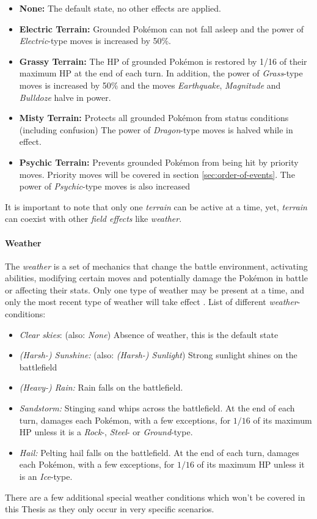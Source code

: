 \begin{itemize}
	\item \textbf{None:} The default state, no other effects are applied. 
	\item \textbf{Electric Terrain:} Grounded Pokémon can not fall asleep and the power of \textit{Electric}-type
		moves is increased by 50\%.
	\item \textbf{Grassy Terrain:} The HP of grounded Pokémon is restored by 1/16 of their maximum HP at the
		end of each turn. In addition, the power of \textit{Grass}-type moves is increased by 50\% and the 
		moves \textit{Earthquake}, \textit{Magnitude} and \textit{Bulldoze} halve in power. 
	\item \textbf{Misty Terrain:} Protects all grounded Pokémon from status conditions (including confusion)
		The power of \textit{Dragon}-type moves is halved while in effect. 
	\item \textbf{Psychic Terrain:} Prevents grounded Pokémon from being hit by priority moves. Priority
	moves will be covered in section \ref{sec:order-of-events}. The power of \textit{Psychic}-type moves is also increased
\end{itemize}
It is important to note that only one \textit{terrain} can be active at a time, yet, \textit{terrain}
can coexist with other \textit{field effects} like \textit{weather}.

\paragraph{Weather}
The \textit{weather} is a set of mechanics that change the battle environment, activating abilities, modifying
certain moves and potentially damage the Pokémon in battle or affecting their stats. Only one type of weather may 
be present at a time, and only the most recent type of weather will take effect \cite{Bulbapedia:Weather}. List
of different \textit{weather}-conditions:
\begin{itemize}
	\item \textit{Clear skies}: (also: \emph{None}) Absence of weather, this is the default state
	\item \textit{(Harsh-) Sunshine:} (also: \emph{(Harsh-) Sunlight}) Strong sunlight shines on the 
	battlefield
	\item \textit{(Heavy-) Rain:} Rain falls on the battlefield.
	\item \textit{Sandstorm:} Stinging sand whips across the battlefield. At the end of each turn, damages each
	Pokémon, with a few exceptions, for $1/16$ of its maximum \ac{HP} unless it is a \textit{Rock}-, \textit{Steel}- or
	\textit{Ground}-type. 
	\item \textit{Hail:} Pelting hail falls on the battlefield. At the end of each turn, damages each
	Pokémon, with a few exceptions, for $1/16$ of its maximum \ac{HP} unless it is an \textit{Ice}-type.
\end{itemize}
There are a few additional special weather conditions which won't be covered in this Thesis as they only occur in 
very specific scenarios.

